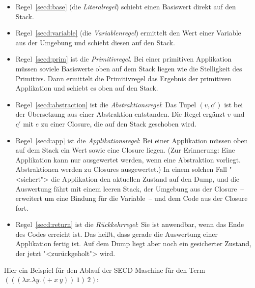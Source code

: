 \begin{itemize}
\item Regel~\ref{secd:base} (die
  \textit{Literalregel}) schiebt einen Basiswert
  direkt auf den Stack.
\item Regel~\ref{secd:variable} (die
  \textit{Variablenregel}) ermittelt den Wert
  einer Variable aus der Umgebung und schiebt diesen auf den Stack.
\item Regel~\ref{secd:prim} ist die
  \textit{Primitivregel}.  Bei einer primitiven
  Applikation müssen soviele Basiswerte oben auf dem Stack liegen wie
  die Stelligkeit des Primitivs.  Dann ermittelt die Primitivregel das Ergebnis der
  primitiven Applikation und schiebt es oben auf den Stack.
\item Regel~\ref{secd:abstraction} ist die
  \textit{Abstraktionsregel}: Das Tupel
  $(v,\underline{c'})$ ist bei der Übersetzung aus einer Abstraktion
  entstanden.  Die Regel ergänzt $v$ und $\underline{c'}$ mit
  $e$ zu einer Closure, die auf den Stack geschoben wird.
\item Regel~\ref{secd:app} ist die
  \textit{Applikationsregel}: Bei einer
  Applikation müssen oben auf dem Stack ein Wert sowie eine Closure
  liegen.  (Zur Erinnerung: Eine Applikation kann nur ausgewertet
  werden, wenn eine Abstraktion vorliegt.  Abstraktionen werden zu
  Closures ausgewertet.)  In einem solchen Fall "<sichert"> die
  Applikation den aktuellen Zustand auf den Dump, und die Auswertung fährt mit
  einem leeren Stack, der Umgebung aus der Closure~-- erweitert um
  eine Bindung für die Variable~-- und dem Code aus der Closure fort.
\item Regel~\ref{secd:return} ist die
  \textit{Rückkehrregel}: Sie ist anwendbar,
  wenn das Ende des Codes erreicht ist.  Das heißt, dass gerade
  die Auswertung einer Applikation fertig ist.  Auf dem Dump liegt
  aber noch ein gesicherter Zustand, der jetzt "<zurückgeholt"> wird.
\end{itemize}
%
Hier ein Beispiel für den Ablauf der SECD-Maschine für den Term
$(((\lambda x.\lambda y.(+~x~y))~1)~2)$:
%
